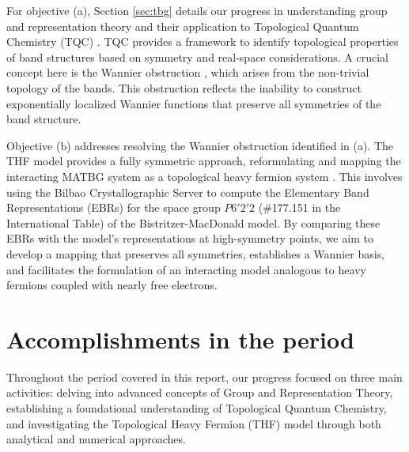 \documentclass[12pt]{report}
\begin{document}
For objective (a), Section \ref{sec:tbg} details our progress in understanding group and representation theory and their application to Topological Quantum Chemistry (TQC) \cite{topological_quantum_chemistry2017, building_blocks2018}. TQC provides a framework to identify topological properties of band structures based on symmetry and real-space considerations. A crucial concept here is the Wannier obstruction \cite{zou2018}, which arises from the non-trivial topology of the bands. This obstruction reflects the inability to construct exponentially localized Wannier functions that preserve all symmetries of the band structure.

Objective (b) addresses resolving the Wannier obstruction identified in (a). The THF model provides a fully symmetric approach, reformulating and mapping the interacting MATBG system as a topological heavy fermion system \cite{topoheavyfermion2022}. This involves using the Bilbao Crystallographic Server \cite{bilbao_1, bilbao_2} to compute the Elementary Band Representations (EBRs) for the space group \( P6'2'2 \) (\#177.151 in the International Table) of the Bistritzer-MacDonald model. By comparing these EBRs with the model's representations at high-symmetry points, we aim to develop a mapping that preserves all symmetries, establishes a Wannier basis, and facilitates the formulation of an interacting model analogous to heavy fermions coupled with nearly free electrons.

\pagebreak


\chapter{Accomplishments in the period} \label{chp:accomplishments}

Throughout the period covered in this report, our progress focused on three main activities: delving into advanced concepts of Group and Representation Theory, establishing a foundational understanding of Topological Quantum Chemistry, and investigating the Topological Heavy Fermion (THF) model through both analytical and numerical approaches.
\end{document}
